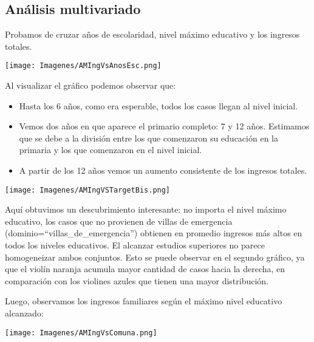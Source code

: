 \documentclass[a4paper]{article}
\begin{document}
    \newpage
    
    \subsection{Análisis multivariado}
 
        Probamos de cruzar años de escolaridad, nivel máximo educativo y los ingresos totales.
 
        \begin{center}
            \texttt{[image: Imagenes/AMIngVsAnosEsc.png]}
        \end{center}
 
        Al visualizar el gráfico podemos observar que:
 
        \begin{itemize}
            \item Hasta los 6 años, como era esperable, todos los casos llegan al nivel inicial.
            \item Vemos dos años en que aparece el primario completo: 7 y 12 años. Estimamos que se debe a la división entre los que comenzaron su educación en la primaria y los que comenzaron en el nivel inicial.
            \item A partir de los 12 años vemos un aumento consistente de los ingresos totales.
        \end{itemize}
 
        \begin{center}
            \texttt{[image: Imagenes/AMIngVSTargetBis.png]}
        \end{center}
 
        Aquí obtuvimos un descubrimiento interesante: no importa el nivel máximo educativo, los casos que no provienen de villas de emergencia (dominio=``villas\_de\_emergencia'') obtienen en promedio ingresos más altos en todos los niveles educativos. El alcanzar estudios superiores no parece homogeneizar ambos conjuntos. Esto se puede observar en el segundo gráfico, ya que el violín naranja acumula mayor cantidad de casos hacia la derecha, en comparación con los violines azules que tienen una mayor distribución.
        
        \newpage

        Luego, observamos los ingresos familiares según el máximo nivel educativo alcanzado:
        \begin{center}
            \texttt{[image: Imagenes/AMIngVsComuna.png]}
        \end{center}
 
\end{document}
